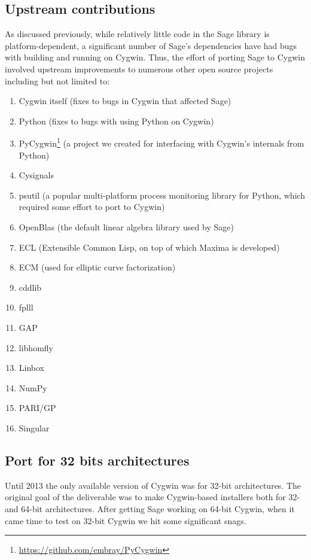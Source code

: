 \hypertarget{upstream-contributions}{%
\subsection{Upstream contributions}}

As discussed previously, while relatively little code in the Sage library is
platform-dependent, a significant number of Sage's dependencies have had bugs
with building and running on Cygwin.  Thus, the effort of porting Sage to
Cygwin involved upstream improvements to numerous other open source projects
including but not limited to:

\begin{enumerate}
\item Cygwin itself (fixes to bugs in Cygwin that affected Sage)
\item Python (fixes to bugs with using Python on Cygwin)
\item PyCygwin\footnote{\url{https://github.com/embray/PyCygwin}} (a project we created for interfacing with Cygwin's internals from Python)
\item Cysignals
\item psutil (a popular multi-platform process monitoring library for Python, which required some effort to port to Cygwin)
\item OpenBlas (the default linear algebra library used by Sage)
\item ECL (Extensible Common Lisp, on top of which Maxima is developed)
\item ECM (used for elliptic curve factorization)
\item cddlib
\item fplll
\item GAP
\item libhomfly
\item Linbox
\item NumPy
\item PARI/GP
\item Singular
\end{enumerate}


\hypertarget{port-for-32-bits-architectures}{%
\subsection{Port for 32 bits
architectures}\label{port-for-32-bits-architectures}}

Until 2013 the only available version of Cygwin was for 32-bit
architectures. The original goal of the deliverable was to make
Cygwin-based installers both for 32- and 64-bit architectures. After
getting Sage working on 64-bit Cygwin, when it came time to test on
32-bit Cygwin we hit some significant snags.


